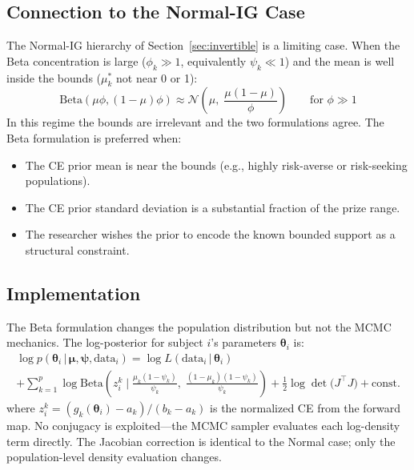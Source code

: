 \documentclass[11pt,a4paper]{article}
\theoremstyle{definition}
\newcommand{\Normal}{\mathcal{N}}
\newcommand{\given}{\,|\,}
\newcommand{\btheta}{\boldsymbol{\theta}}
\newcommand{\bmu}{\boldsymbol{\mu}}
\begin{document}
\subsection{Connection to the Normal-IG Case}

The Normal-IG hierarchy of Section~\ref{sec:invertible} is a limiting case.
When the Beta concentration is large ($\phi_k \gg 1$, equivalently
$\psi_k \ll 1$) and the mean is well inside the bounds ($\mu_k^*$ not near 0
or 1):
\begin{equation}
    \mathrm{Beta}(\mu\phi, (1-\mu)\phi) \approx
    \Normal\!\left(\mu, \; \frac{\mu(1-\mu)}{\phi}\right)
    \qquad \text{for } \phi \gg 1
\end{equation}
In this regime the bounds are irrelevant and the two formulations agree. The
Beta formulation is preferred when:
\begin{itemize}
    \item The CE prior mean is near the bounds (e.g., highly risk-averse or
    risk-seeking populations).
    \item The CE prior standard deviation is a substantial fraction of the
    prize range.
    \item The researcher wishes the prior to encode the known bounded support
    as a structural constraint.
\end{itemize}

\subsection{Implementation}

The Beta formulation changes the population distribution but not the MCMC
mechanics. The log-posterior for subject $i$'s parameters $\btheta_i$ is:
\begin{multline}
    \label{eq:log_posterior_beta}
    \log p(\btheta_i \given \bmu, \bm{\psi}, \text{data}_i) =
    \log L(\text{data}_i \given \btheta_i) \\
    + \sum_{k=1}^p \log \mathrm{Beta}\!\left(z_i^k \;\Big|\;
    \frac{\mu_k(1-\psi_k)}{\psi_k},\;
    \frac{(1-\mu_k)(1-\psi_k)}{\psi_k}\right)
    + \frac{1}{2}\log\det\!\big(J^\top J\big)
    + \text{const.}
\end{multline}
where $z_i^k = (g_k(\btheta_i) - a_k)/(b_k - a_k)$ is the normalized CE from
the forward map. No conjugacy is exploited---the MCMC sampler evaluates each
log-density term directly. The Jacobian correction is identical to the Normal
case; only the population-level density evaluation changes.
\end{document}

